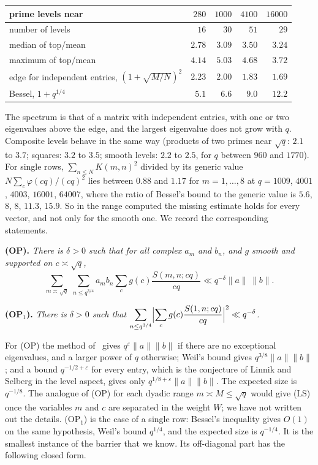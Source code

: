 \documentclass[11pt]{amsart}
\theoremstyle{definition}
\theoremstyle{remark}
\numberwithin{equation}{section}
\newcommand{\eps}{\varepsilon}
\begin{document}
\medskip
\begin{center}
\begin{tabular}{lrrrr}
prime levels near & $280$ & $1000$ & $4100$ & $16000$\\ \hline
number of levels & $16$ & $30$ & $51$ & $29$\\
median of top/mean & $2.78$ & $3.09$ & $3.50$ & $3.24$\\
maximum of top/mean & $4.14$ & $5.03$ & $4.68$ & $3.72$\\
edge for independent entries, $(1+\sqrt{M/N})^2$ & $2.23$ & $2.00$ & $1.83$ & $1.69$\\
Bessel, $1+q^{1/4}$ & $5.1$ & $6.6$ & $9.0$ & $12.2$
\end{tabular}
\end{center}
\medskip

The spectrum is that of a matrix with independent entries, with one or two
eigenvalues above the edge, and the largest eigenvalue does not grow with
$q$.  Composite levels behave in the same way (products of two primes near
$\sqrt q$: $2.1$ to $3.7$; squares: $3.2$ to $3.5$; smooth levels: $2.2$ to
$2.5$, for $q$ between $960$ and $1770$).  For single rows,
$\sum_{n\le N}K(m,n)^2$ divided by its generic value
$N\sum_c\varphi(cq)/(cq)^2$ lies between $0.88$ and $1.17$ for
$m=1,\dots,8$ at $q=1009$, $4001$, $4003$, $16001$, $64007$, where the ratio
of Bessel's bound to the generic value is $5.6$, $8$, $8$, $11.3$, $15.9$.
So in the range computed the missing estimate holds for every vector, and
not only for the smooth one.  We record the corresponding statements.

\medskip\noindent\textbf{(OP).}  \emph{There is $\delta>0$ such that for
all complex $a_m$ and $b_n$, and $g$ smooth and supported on
$c\asymp\sqrt q$,
\[
 \sum_{m\asymp\sqrt q}\ \sum_{n\le q^{3/4}}a_mb_n\sum_{c}g(c)
 \frac{S(m,n;cq)}{cq}\ll q^{-\delta}\|a\|\,\|b\|.
\]}

\noindent\textbf{(OP$_1$).}  \emph{There is $\delta>0$ such that
$\displaystyle\sum_{n\le q^{3/4}}\Bigl|\sum_cg(c)\frac{S(1,n;cq)}{cq}
\Bigr|^2\ll q^{-\delta}$.}

\medskip
For (OP) the method of~\cite{DI82} gives $q^{\eps}\|a\|\|b\|$ if there are
no exceptional eigenvalues, and a larger power of $q$ otherwise; Weil's
bound gives $q^{3/8}\|a\|\|b\|$; and a bound $q^{-1/2+\eps}$ for every entry,
which is the conjecture of Linnik and Selberg in the level aspect, gives
only $q^{1/8+\eps}\|a\|\|b\|$.  The expected size is $q^{-1/8}$.  The
analogue of (OP) for each dyadic range $m\asymp M\le\sqrt q$ would give
(LS) once the variables $m$ and $c$ are separated in the weight $W$; we
have not written out the details.  (OP$_1$) is the case of a single row:
Bessel's inequality gives $O(1)$ on the same hypothesis, Weil's bound
$q^{1/4}$, and the expected size is $q^{-1/4}$.  It is the smallest instance of the barrier
that we know.  Its off-diagonal part has the following closed form.
\end{document}
